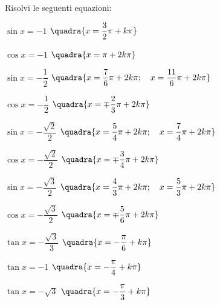 \begin{esercizio}\label{ese:03.1}
Risolvi le seguenti equazioni:
 \begin{enumeratea}
  \item $\sin x = -1$
   \hfill $\quadra{x = \dfrac{3}{2}\pi + k \pi}$
  \item $\cos x = -1$
   \hfill $\quadra{x = \pi + 2k \pi}$
  \item $\sin x = -\dfrac{1}{2}$
   \hfill $\quadra{x = \dfrac{7}{6}\pi + 2k \pi; \quad
                   x = \dfrac{11}{6}\pi + 2k \pi}$
  \item $\cos x = -\dfrac{1}{2}$
   \hfill $\quadra{x = \mp \dfrac{2}{3}\pi + 2k \pi}$
  \item $\sin x = -\dfrac{\sqrt{2}}{2}$
   \hfill $\quadra{x = \dfrac{5}{4}\pi + 2k \pi; \quad
                   x = \dfrac{7}{4}\pi + 2k \pi}$
  \item $\cos x = -\dfrac{\sqrt{2}}{2}$
   \hfill $\quadra{x = \mp \dfrac{3}{4}\pi + 2k \pi}$
  \item $\sin x = -\dfrac{\sqrt{3}}{2}$
   \hfill $\quadra{x = \dfrac{4}{3}\pi + 2k \pi; \quad
                   x = \dfrac{5}{3}\pi + 2k \pi}$
  \item $\cos x = -\dfrac{\sqrt{3}}{2}$
   \hfill $\quadra{x = \mp \dfrac{5}{6}\pi + 2k \pi}$
  \item $\tan x = -\dfrac{\sqrt{3}}{3}$
   \hfill $\quadra{x = -\dfrac{\pi}{6} + k \pi}$
  \item $\tan x = -1$
   \hfill $\quadra{x = -\dfrac{\pi}{4} + k \pi}$
  \item $\tan x = -\sqrt{3}$
   \hfill $\quadra{x = -\dfrac{\pi}{3} + k \pi}$
 \end{enumeratea}
\end{esercizio}

